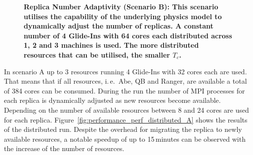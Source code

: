 \documentclass{rspublic}
\newcommand{\alnote}[1]{ {\textcolor{blue} { ***AL: #1 }}}
\newcommand{\jhanote}[1]{ {\textcolor{red} { ***SJ: #1 }}}
\newcommand{\alnote}[1]{}
\newcommand{\jhanote}[1]{}
\begin{document}
\begin{figure}[h]
\begin{minipage}[t]{.485\textwidth}
\begin{center}
      \caption{\footnotesize \bf Replica Number Adaptivity (Scenario B):  
      This scenario utilises the capability of the underlying physics model 
      to dynamically adjust the number of replicas. 
      A constant number of 4 Glide-Ins with 64 cores each 
      distributed across 1, 2 and 3 machines is  used. 
      The more distributed resources that can be utilised, the smaller $T_{c}$.}
      \label{fig:performance_perf_distributed_B}
    \end{center}
  \end{minipage}
  \hfill
\end{figure}

                     
In scenario A up to 3 resources running 4 Glide-Ins with 32 cores each are used. 
That means that if all resources, i.\,e.\ Abe, QB and Ranger, are available
a total of 384 cores can be consumed. 
During the run the number of MPI processes for each replica is 
dynamically adjusted  as new resources 
become available. Depending on the number of available resources between
8 and 24 cores are used for each replica.
Figure~\ref{fig:performance_perf_distributed_A} shows the results of the distributed
run. Despite the overhead for migrating the replica to newly available
resources, a notable speedup of up to 15\,minutes can be observed with the increase of 
the number of resources.
\end{document}
